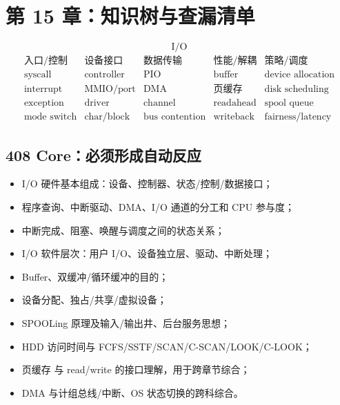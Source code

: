 \documentclass[11pt,a4paper]{ctexart}
\begin{document}
\section{第 15 章：知识树与查漏清单}

\begin{corebox}[I/O 知识树]
\[
\boxed{\text{I/O}}
\]
\[
\begin{array}{lllll}
\text{入口/控制} & \text{设备接口} & \text{数据传输} & \text{性能/解耦} & \text{策略/调度}\\[0.3em]
\text{syscall} & \text{controller} & \text{PIO} & \text{buffer} & \text{device allocation}\\
\text{interrupt} & \text{MMIO/port} & \text{DMA} & \text{页缓存} & \text{disk scheduling}\\
\text{exception} & \text{driver} & \text{channel} & \text{readahead} & \text{spool queue}\\
\text{mode switch} & \text{char/block} & \text{bus contention} & \text{writeback} & \text{fairness/latency}
\end{array}
\]
\end{corebox}

\subsection{408 Core：必须形成自动反应}
\begin{itemize}
  \item I/O 硬件基本组成：设备、控制器、状态/控制/数据接口；
  \item 程序查询、中断驱动、DMA、I/O 通道的分工和 CPU 参与度；
  \item 中断完成、阻塞、唤醒与调度之间的状态关系；
  \item I/O 软件层次：用户 I/O、设备独立层、驱动、中断处理；
  \item Buffer、双缓冲/循环缓冲的目的；
  \item 设备分配、独占/共享/虚拟设备；
  \item SPOOLing 原理及输入/输出井、后台服务思想；
  \item HDD 访问时间与 FCFS/SSTF/SCAN/C-SCAN/LOOK/C-LOOK；
  \item 页缓存 与 read/write 的接口理解，用于跨章节综合；
  \item DMA 与计组总线/中断、OS 状态切换的跨科综合。
\end{itemize}
\end{document}

